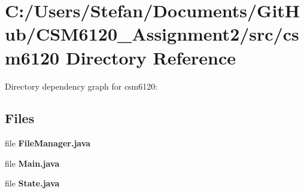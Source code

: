 \section{C\+:/\+Users/\+Stefan/\+Documents/\+Git\+Hub/\+C\+S\+M6120\+\_\+\+Assignment2/src/csm6120 Directory Reference}
\label{dir_c3b56f187ce6c57130618dc9b84636dd}
Directory dependency graph for csm6120\+:
\subsection*{Files}
\begin{DoxyCompactItemize}
\item 
file {\bf File\+Manager.\+java}
\item 
file {\bf Main.\+java}
\item 
file {\bf State.\+java}
\end{DoxyCompactItemize}
